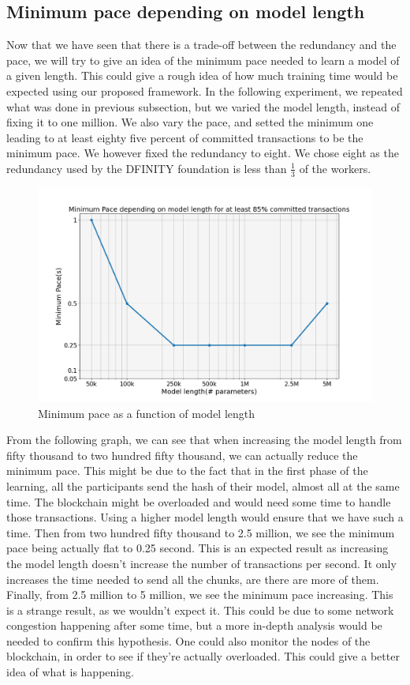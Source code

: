 \documentclass{article}
\begin{document}
\subsection{Minimum pace depending on model length}
Now that we have seen that there is a trade-off between the redundancy and the pace, we will try to give an idea of the
minimum pace needed to learn a model of a given length. This could give a rough idea of how much training time would be
expected using our proposed framework. In the following experiment, we repeated what was done in previous subsection,
but we varied the model length, instead of fixing it to one million. We also vary the pace, and setted the minimum one leading
to at least eighty five percent of committed transactions to be the minimum pace. We however fixed the redundancy to eight. We chose eight as
the redundancy used by the DFINITY foundation is less than $\frac{1}{3}$ \cite{DFINITY_redundancy} of the workers.
\begin{figure}[H]
    \hspace*{-2cm}
        \includegraphics[scale=0.5]{length_pace}
    \hspace{2mm}%
    \caption{Minimum pace as a function of model length}
\end{figure}
From the following graph, we can see that when increasing the model length from fifty thousand to two hundred
fifty thousand, we can actually reduce the minimum pace. This might be due to the fact that in the first phase of the
learning, all the participants send the hash of their model, almost all at the same time. The blockchain might be overloaded
and would need some time to handle those transactions. Using a higher model length would ensure that we have such a time.
Then from two hundred fifty thousand to 2.5 million, we see the minimum pace being actually flat to 0.25 second. This is an expected result
as increasing the model length doesn't increase the number of transactions per second. It only increases the time needed to
send all the chunks, are there are more of them. Finally, from 2.5 million to 5 million, we see the minimum pace increasing.
This is a strange result, as we wouldn't expect it. This could be due to some network congestion happening after some time,
but a more in-depth analysis would be needed to confirm this hypothesis. One could also monitor the nodes of the blockchain,
in order to see if they're actually overloaded. This could give a better idea of what is happening.
\end{document}
